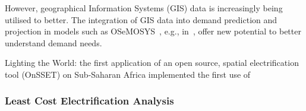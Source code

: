 \documentclass[conference, a4paper]{IEEEtran}
\begin{document}
 However, geographical Information Systems (GIS) data is increasingly being utilised to better. The integration of GIS data into demand prediction and projection in models such as OSeMOSYS~\cite{howells-rogner-ea-2011}, e.g., in~\cite{rocco-fumagalli-ea-2021}, offer new potential to better understand demand needs.  

Lighting the World: the first application of an open source, spatial electrification tool (OnSSET) on Sub-Saharan Africa
\citet{mentis-howells-ea-2017} \cite{mentis-howells-ea-2017} implemented the first use of 


\subsubsection{Least Cost Electrification Analysis}


\end{document}
